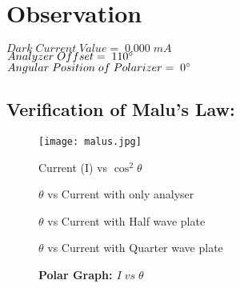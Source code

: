 \section{Observation}
    \vspace{-3mm}
    \noindent $Dark \;Current\; Value=\; 0.000\; mA$\\
    $Analyzer\;Offset=\;110\degree$ \\
    $Angular\; Position\;of\;Polarizer=\;0\degree$\\

    \vspace{-8mm}
    \subsection{Verification of Malu's Law:}

    \vspace{-4mm}
    

    \vspace{-7mm}
    \begin{figure}[H]
        \centering
        \texttt{[image: malus.jpg]}
        \caption{Current (I) vs $\cos^2\theta$}
        \label{fig:5}
    \end{figure}

    \begin{figure}[H]
        \centering
        \caption{$\theta$ vs Current with only analyser}
        \label{fig:6}
    \end{figure}

    \begin{figure}[H]
        \centering
        \caption{$\theta$ vs Current with Half wave plate}
        \label{fig:7}
    \end{figure}

    \begin{figure}[H]
        \centering
        \caption{$\theta$ vs Current with Quarter wave plate}
        \label{fig:8}
    \end{figure}

    \begin{figure}[H]
        \centering
        \caption{\textbf{Polar Graph: $I\;vs\;\theta$}}
        \label{fig:9}
    \end{figure}


